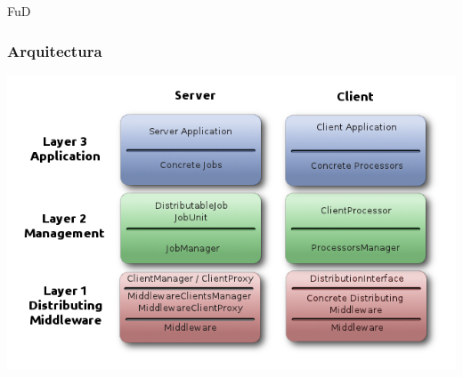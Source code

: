 \begin{subsection}{FuD}
\begin{frame}\frametitle{Arquitectura}
     \begin{center}
        \includegraphics[scale=.45]{images/FuD-AbstractLayers.png}
      \end{center}
\end{frame}

\end{subsection}

% 
